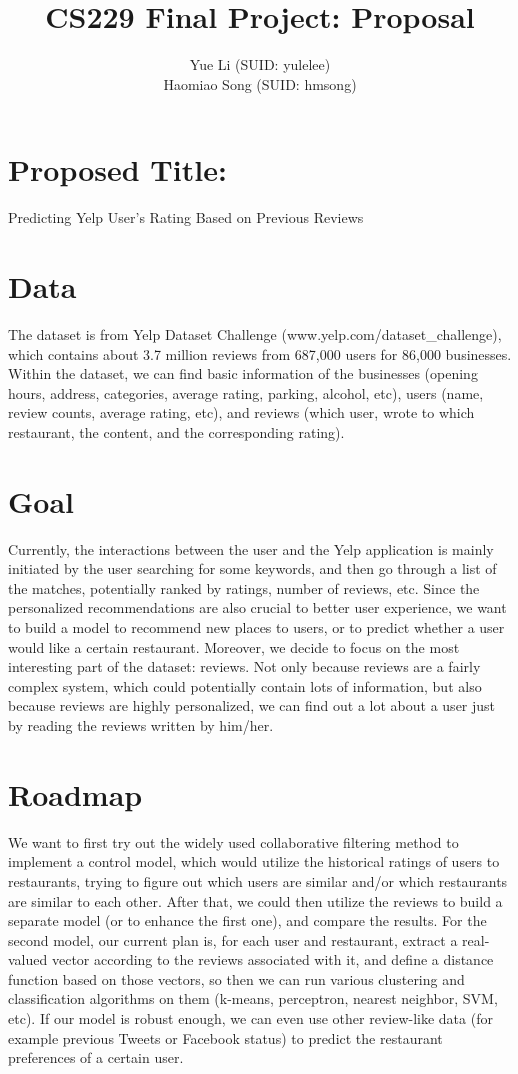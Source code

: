 \documentclass[12pt]{article}
\title{CS229 Final Project: Proposal}
\author{Yue Li (SUID: yulelee) \\
Haomiao Song (SUID: hmsong)}
\date{}
\begin{document}
\maketitle

\section*{Proposed Title:}
Predicting Yelp User's Rating Based on Previous Reviews

\section*{Data}
The dataset is from Yelp Dataset Challenge (www.yelp.com/dataset\_challenge), which contains about 3.7 million reviews from 687,000 users for 86,000 businesses. Within the dataset, we can find basic information of the businesses (opening hours, address, categories, average rating, parking, alcohol, etc), users (name, review counts, average rating, etc), and reviews (which user, wrote to which restaurant, the content, and the corresponding rating). 

\section*{Goal}
Currently, the interactions between the user and the Yelp application is mainly initiated by the user searching for some keywords, and then go through a list of the matches, potentially ranked by ratings, number of reviews, etc. 
Since the personalized recommendations are also crucial to better user experience, we want to build a model to recommend new places to users, or to predict whether a user would like a certain restaurant. Moreover, we decide to focus on the most interesting part of the dataset: reviews. Not only because reviews are a fairly complex system, which could potentially contain lots of information, but also because reviews are highly personalized, we can find out a lot about a user just by reading the reviews written by him/her.

\section*{Roadmap}
We want to first try out the widely used collaborative filtering method to implement a control model, which would utilize the historical ratings of users to restaurants, trying to figure out which users are similar and/or which restaurants are similar to each other. After that, we could then utilize the reviews to build a separate model (or to enhance the first one), and compare the results. For the second model, our current plan is, for each user and restaurant, extract a real-valued vector according to the reviews associated with it, and define a distance function based on those vectors, so then we can run various clustering and classification algorithms on them (k-means, perceptron, nearest neighbor, SVM, etc). If our model is robust enough, we can even use other review-like data (for example previous Tweets or Facebook status) to predict the restaurant preferences of a certain user.
\end{document}
